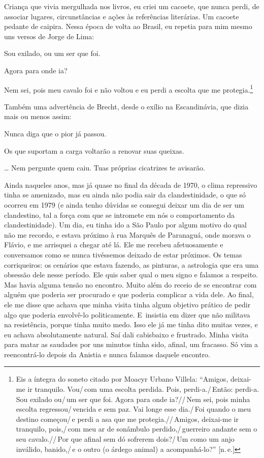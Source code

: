 Criança que vivia mergulhada nos livros, eu criei um cacoete, que nunca
perdi, de associar lugares, circunstâncias e ações às referências
literárias. Um cacoete pedante de caipira. Nessa época de volta ao
Brasil, eu repetia para mim mesmo uns versos de Jorge de Lima:

\startblockquote
Sou exilado, ou um ser que foi.

Agora para onde ia?

Nem sei, pois meu cavalo foi e não voltou e eu perdi a escolta que me protegia.\footnote{Eis a íntegra do soneto citado por Moacyr Urbano Villela: “Amigos, deixai-me ir tranquilo. Vou/\,com uma escolta perdida. Pois, perdi-a./\,Então: perdi-a. Sou exilado ou/\,um ser que foi. Agora para onde ia?//\,Nem sei, pois minha escolta regressou/\,vencida e sem paz. Vai longe esse dia./\,Foi quando o meu destino começou/\,e perdi a asa que me protegia.//\,Amigos, deixai-me ir tranquilo, pois,/\,com meu ar de sonâmbulo perdido,/\,guerreiro andante sem o seu cavalo.//\,Por que afinal sem dó sofrerem dois?/\,Um como um anjo inválido, banido,/\,e o outro (o árdego animal) a acompanhá-lo?” {[}{\sc n.\,e.}{]}}
\stopblockquote

Também uma advertência de Brecht, desde o exílio na Escandinávia, que
dizia mais ou menos assim:

\startblockquote
Nunca diga que o pior já passou.

Os que suportam a carga voltarão a renovar suas queixas.

\ldots{} Nem pergunte quem caiu. Tuas próprias cicatrizes te avisarão.
\stopblockquote

Ainda naqueles anos, mas já quase no final da década de 1970, o clima
repressivo tinha se amenizado, mas eu ainda não podia sair da
clandestinidade, o que só ocorreu em 1979 (e ainda tenho dúvidas se
consegui deixar um dia de ser um clandestino, tal a força com que se
intromete em nós o comportamento da clandestinidade). Um dia, eu tinha
ido a São Paulo por algum motivo do qual não me recordo, e estava próximo
à rua Marquês de Paranaguá, onde morava o Flávio, e me arrisquei a chegar
até lá. Ele me recebeu afetuosamente e conversamos como se nunca
tivéssemos deixado de estar próximos. Os temas corriqueiros: os
cenários que estava fazendo, as pinturas, a astrologia que era uma
obsessão dele nesse período. Ele quis saber qual o meu signo e falamos a
respeito. Mas havia alguma tensão no encontro. Muito além do receio de
se encontrar com alguém que poderia ser procurado e que poderia
complicar a vida dele. Ao final, ele me disse que achava que minha visita
tinha algum objetivo prático de pedir algo que poderia envolvê-lo
politicamente. E~insistia em dizer que não militava na resistência,
porque tinha muito medo. Isso ele já me tinha dito muitas vezes, e eu
achava absolutamente natural. Saí dali cabisbaixo e frustrado. Minha
visita para matar as saudades por uns minutos tinha sido, afinal, um
fracasso. Só vim a reencontrá-lo depois da Anistia e nunca falamos
daquele encontro.

